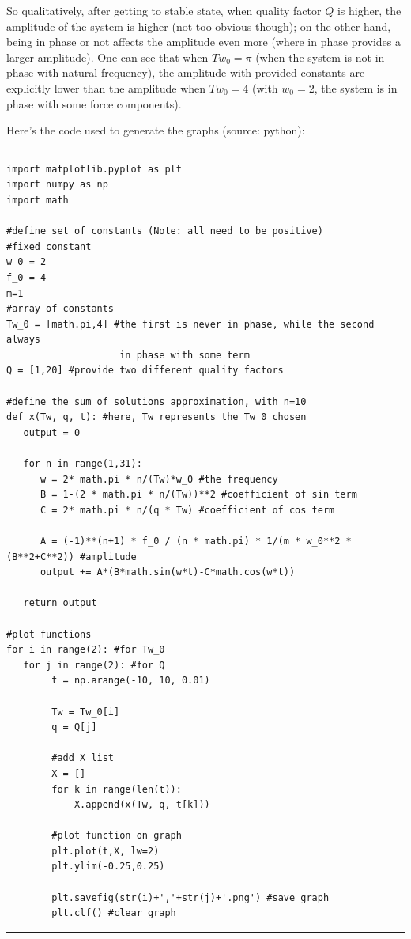 \documentclass{article}
\begin{document}
So qualitatively, after getting to stable state, when quality factor $Q$ is higher, the amplitude of the system is higher (not too obvious though); on the other hand, being in phase or not affects the amplitude even more (where in phase provides a larger amplitude). One can see that when $Tw_0 = \pi$ (when the system is not in phase with natural frequency), the amplitude with provided constants are explicitly lower than the amplitude when $Tw_0 = 4$ (with $w_0 = 2$, the system is in phase with some force components).

\hfil

Here's the code used to generate the graphs (source: python):

\rule{15.24cm}{0.01mm}

\begin{verbatim}
import matplotlib.pyplot as plt
import numpy as np
import math

#define set of constants (Note: all need to be positive)
#fixed constant
w_0 = 2 
f_0 = 4
m=1
#array of constants
Tw_0 = [math.pi,4] #the first is never in phase, while the second always 
                    in phase with some term
Q = [1,20] #provide two different quality factors

#define the sum of solutions approximation, with n=10
def x(Tw, q, t): #here, Tw represents the Tw_0 chosen
   output = 0

   for n in range(1,31):
      w = 2* math.pi * n/(Tw)*w_0 #the frequency
      B = 1-(2 * math.pi * n/(Tw))**2 #coefficient of sin term
      C = 2* math.pi * n/(q * Tw) #coefficient of cos term

      A = (-1)**(n+1) * f_0 / (n * math.pi) * 1/(m * w_0**2 * (B**2+C**2)) #amplitude
      output += A*(B*math.sin(w*t)-C*math.cos(w*t))

   return output

#plot functions
for i in range(2): #for Tw_0
   for j in range(2): #for Q
        t = np.arange(-10, 10, 0.01)

        Tw = Tw_0[i]
        q = Q[j]

        #add X list
        X = []
        for k in range(len(t)):
            X.append(x(Tw, q, t[k]))

        #plot function on graph
        plt.plot(t,X, lw=2)
        plt.ylim(-0.25,0.25)

        plt.savefig(str(i)+','+str(j)+'.png') #save graph
        plt.clf() #clear graph
\end{verbatim}

\rule{15.24cm}{0.01mm}
\end{document}
